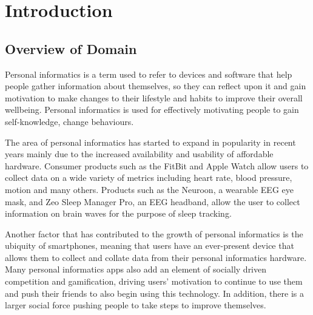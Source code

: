 \section{Introduction}\label{sec:introduction}

\subsection{Overview of Domain}


Personal informatics is a term used to refer to devices and software that help people gather
information about themselves, so they can reflect upon it and gain motivation to make changes to
their lifestyle and habits to improve their overall wellbeing. Personal informatics is used for
effectively motivating people to gain self-knowledge, change behaviours. %

The area of personal informatics has started to expand in popularity in recent years mainly due to
the increased availability and usability of affordable hardware. Consumer products such as the
FitBit and Apple Watch allow users to collect data on a wide variety of metrics including heart
rate, blood pressure, motion and many others. Products such as the Neuroon, a wearable EEG eye mask,
and Zeo Sleep Manager Pro, an EEG headband, allow the user to collect information on brain waves for
the purpose of sleep tracking.


Another factor that has contributed to the growth of personal informatics is the ubiquity of
smartphones, meaning that users have an ever-present device that allows them to collect and collate
data from their personal informatics hardware. Many personal informatics apps also add an element of
socially driven competition and gamification, driving users' motivation to continue to use them and
push their friends to also begin using this technology. In addition, there is a larger social force
pushing people to take steps to improve themselves. %


